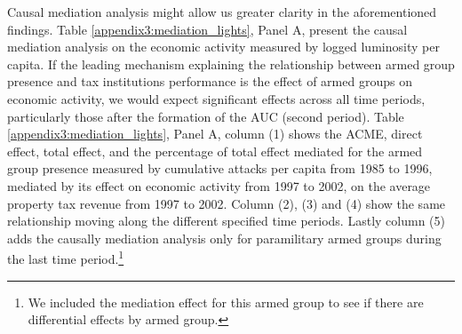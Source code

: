 \begin{table}[htbp]
\def\sym#1{\ifmmode^{#1}\else\(^{#1}\)\fi}
\centering
\caption{Cumulative violence and tax performance, controlling for post-treatment economic outcomes}
\label{appendix3:correct_light}
\end{table}

Causal mediation analysis might allow us greater clarity in the aforementioned findings. Table \ref{appendix3:mediation_lights}, Panel A, present the causal mediation analysis on the economic activity measured by logged luminosity per capita. If the leading mechanism explaining the relationship between armed group presence and tax institutions performance is the effect of armed groups on economic activity, we would expect significant effects across all time periods, particularly those after the formation of the AUC (second period). Table \ref{appendix3:mediation_lights}, Panel A, column (1) shows the ACME, direct effect, total effect, and the percentage of total effect mediated for the armed group presence measured by cumulative attacks per capita from 1985 to 1996, mediated by its effect on economic activity from 1997 to 2002, on the average property tax revenue from 1997 to 2002. Column (2), (3) and (4) show the same relationship moving along the different specified time periods. Lastly column (5) adds the causally mediation analysis only for paramilitary armed groups during the last time period.\footnote{We included the mediation effect for this armed group to see if there are differential effects  by armed group.}

